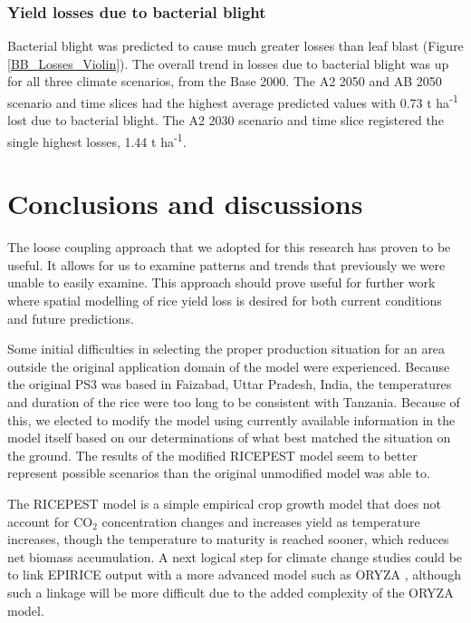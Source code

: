     \subsubsection{Yield losses due to bacterial blight}
    \label{bb_yield_losses}
    Bacterial blight was predicted to cause much greater losses than leaf blast (Figure \ref{BB_Losses_Violin}). The overall trend in losses due to bacterial blight was up for all three climate scenarios, from the Base 2000. The A2 2050 and AB 2050 scenario and time slices had the highest average predicted values with 0.73 t ha\textsuperscript{-1} lost due to bacterial blight. The A2 2030 scenario and time slice registered the single highest losses, 1.44 t ha\textsuperscript{-1}.
        
    \section{Conclusions and discussions}
    \label{conclusions}
    The loose coupling approach that we adopted for this research has proven to be useful. It allows for us to examine patterns and trends that previously we were unable to easily examine. This approach should prove useful for further work where spatial modelling of rice yield loss is desired for both current conditions and future predictions.
    
    Some initial difficulties in selecting the proper production situation for an area outside the original application domain of the model were experienced. Because the original PS3 was based in Faizabad, Uttar Pradesh, India, the temperatures and duration of the rice were too long to be consistent with Tanzania. Because of this, we elected to modify the model using currently available information in the model itself based on our determinations of what best matched the situation on the ground. The results of the modified RICEPEST model seem to better represent possible scenarios than the original unmodified model was able to.
    
    The RICEPEST model is a simple empirical crop growth model that does not account for CO$_2$ concentration changes and increases yield as temperature increases, though the temperature to maturity is reached sooner, which reduces net biomass accumulation. A next logical step for climate change studies could be to link EPIRICE output with a more advanced model such as ORYZA \citep{Oryza}, although such a linkage will be more difficult due to the added complexity of the ORYZA model.
    
